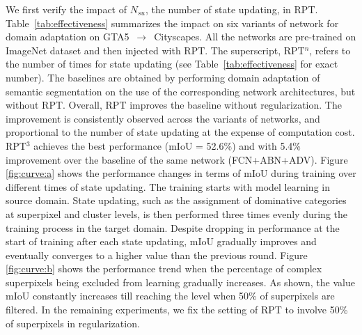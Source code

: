 \documentclass[10pt,twocolumn,letterpaper]{article}
\begin{document}
We first verify the impact of $N_{su}$, the number of state updating, in RPT. Table~\ref{tab:effectiveness} summarizes the impact on six variants of network for domain adaptation on GTA5~$\to$~Cityscapes.
All the networks are pre-trained on ImageNet dataset and then injected with RPT.
The superscript, RPT$^{n}$, refers to the number of times for state updating (see Table~\ref{tab:effectiveness} for exact number).
The baselines are obtained by performing domain adaptation of semantic segmentation on the use of the corresponding network architectures, but without RPT.
Overall, RPT improves the baseline without regularization. The improvement is consistently observed across the variants of networks, and proportional to the number of state updating at the expense of computation cost. RPT$^{3}$ achieves the best performance (mIoU = 52.6\%) and with 5.4\% improvement over the baseline of the same network (FCN+ABN+ADV). Figure \ref{fig:curve:a} shows the performance changes in terms of mIoU during training over different times of state updating. The training starts with model learning in source domain. State updating, such as the assignment of dominative categories at superpixel and cluster levels, is then performed three times evenly during the training process in the target domain.
Despite dropping in performance at the start of training after each state updating, mIoU gradually improves and eventually converges to a higher value than the previous round.
Figure \ref{fig:curve:b} shows the performance trend when the percentage of complex superpixels being excluded from learning gradually increases. As shown, the value mIoU constantly increases till reaching the level when 50\% of superpixels are filtered. In the remaining experiments, we fix the setting of RPT to involve 50\% of superpixels in regularization.
\end{document}
